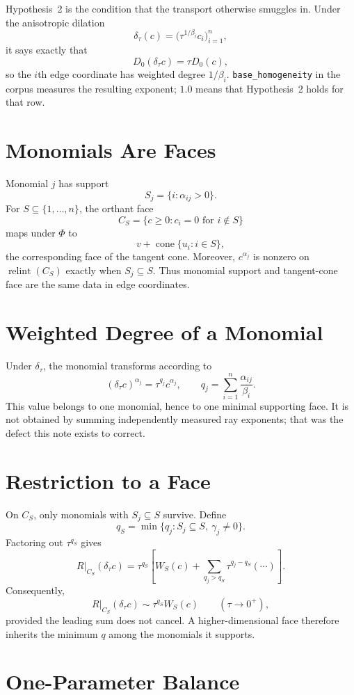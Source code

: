 \documentclass[11pt]{article}
\theoremstyle{definition}
\theoremstyle{remark}
\DeclareMathOperator{\cone}{cone}
\DeclareMathOperator{\relint}{relint}
\begin{document}
Hypothesis~2 is the condition that the transport otherwise smuggles in.
Under the anisotropic dilation
\[
  \delta_\tau(c)
  =\bigl(\tau^{1/\beta_i}c_i\bigr)_{i=1}^n,
\]
it says exactly that
\[
  D_0(\delta_\tau c)=\tau D_0(c),
\]
so the $i$th edge coordinate has weighted degree $1/\beta_i$.
\texttt{base\_homogeneity} in the corpus measures the resulting exponent;
$1.0$ means that Hypothesis~2 holds for that row.

\section{Monomials Are Faces}

Monomial $j$ has support
\[
  S_j=\{i:\alpha_{ij}>0\}.
\]
For $S\subseteq\{1,\dots,n\}$, the orthant face
\[
  C_S=\{c\geq0:c_i=0\text{ for }i\notin S\}
\]
maps under $\Phi$ to
\[
  v+\cone\{u_i:i\in S\},
\]
the corresponding face of the tangent cone.  Moreover,
$c^{\alpha_j}$ is nonzero on $\relint(C_S)$ exactly when $S_j\subseteq S$.
Thus monomial support and tangent-cone face are the same data in edge
coordinates.

\section{Weighted Degree of a Monomial}

Under $\delta_\tau$, the monomial transforms according to
\[
  (\delta_\tau c)^{\alpha_j}
  =\tau^{q_j}c^{\alpha_j},
  \qquad
  q_j=\sum_{i=1}^n\frac{\alpha_{ij}}{\beta_i}.
\]
This value belongs to one monomial, hence to one minimal supporting face.  It
is not obtained by summing independently measured ray exponents; that was the
defect this note exists to correct.

\section{Restriction to a Face}

On $C_S$, only monomials with $S_j\subseteq S$ survive.  Define
\[
  q_S=\min\{q_j:S_j\subseteq S,\ \gamma_j\neq0\}.
\]
Factoring out $\tau^{q_S}$ gives
\[
  R\big|_{C_S}(\delta_\tau c)
  =\tau^{q_S}
   \left[
     W_S(c)
     +\sum_{q_j>q_S}\tau^{q_j-q_S}(\cdots)
   \right].
\]
Consequently,
\[
  R\big|_{C_S}(\delta_\tau c)
  \sim \tau^{q_S}W_S(c)
  \qquad (\tau\to0^+),
\]
provided the leading sum does not cancel.  A higher-dimensional face therefore
inherits the minimum $q$ among the monomials it supports.

\section{One-Parameter Balance}
\end{document}
